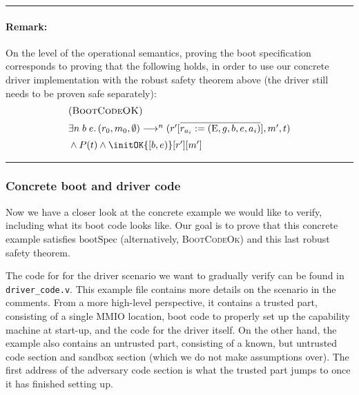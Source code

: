 \documentclass{article}
\newcommand{\X}[1]{\ensuremath{\mathrm{#1}}}
\newcommand{\T}[1]{\texttt{#1}}
\newenvironment{remark}
{ \bigskip\hrule\vspace{-1.3em}\nobreak
  \paragraph*{Remark:}}
{\vspace*{0.5em}\hrule\medskip}
\begin{document}
\begin{remark}
  On the level of the operational semantics, proving the boot specification
  corresponds to proving that the following holds, in order to use our concrete
  driver implementation with the robust safety theorem above (the driver still
  needs to be proven safe separately):
\[
  \begin{array}{l}
    (\textsc {BootCodeOK}) \\[0.5em]
%
    \exists n\; b\; e\ldotp (r_0, m_0, \emptyset) \longrightarrow^n (r'[\overline{r_{a_{i}}
    := (\X{E}, g, b, e, a_i)}], m', t) \\[0.5em]
    {} \land P(t) \land \initOK{[b,e)}[r'][m']
  \end{array}
\]
\end{remark}

\subsubsection{Concrete boot and driver code}
\label{subsec:driverimpl}
Now we have a closer look at the concrete example we would like to verify,
including what its boot code looks like. Our goal is to prove that this concrete
example satisfies \X{bootSpec} (alternatively, \textsc{BootCodeOk}) and this
last robust safety theorem.

The code for for the driver scenario we want to gradually verify can
be found in \T{driver\_code.v}. This example file contains more details on the
scenario in the comments. From a more high-level perspective, it contains a
trusted part, consisting of a single MMIO location, boot code to properly set up
the capability machine at start-up, and the code for the driver itself. On the
other hand, the example also contains an untrusted part, consisting of a known,
but untrusted code section and sandbox section (which we do not make assumptions
over).
The first address of the adversary code section is what the trusted part jumps
to once it has finished setting up.
\end{document}

